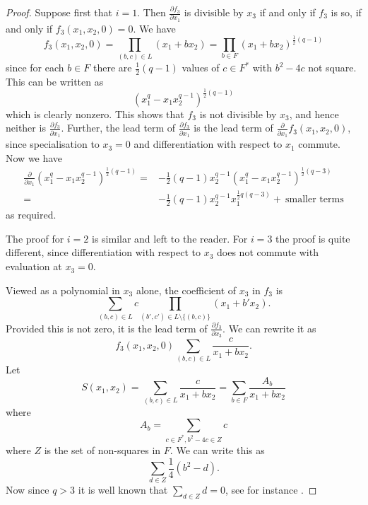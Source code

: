 \documentclass[a4paper]{amsart}
\newtheorem*{Corollary of Conjecture}{Corollary of Conjecture}
\theoremstyle{definition}
\theoremstyle{remark}
\theoremstyle{Acknowledgments}
\begin{document}
\begin{proof}
Suppose first that $i=1$. Then $\frac{\partial f_3}{\partial x_1}$ is divisible by $x_3$ if and only if $f_3$ is so, if and only if $f_3(x_1,x_2,0) = 0$. We have
\[f_3(x_1,x_2,0) = \prod_{(b,c) \in L} (x_1+bx_2) = \prod_{b \in F} (x_1+bx_2)^{\frac12 (q-1)}\]
since for each $b \in F$ there are $\frac12(q-1)$ values of $c \in F^{*}$ with $b^2-4c$ not square. This can be written as
\[(x_1^{q}-x_1x_2^{q-1})^{\frac12(q-1)}\] which is clearly nonzero. This shows that $f_3$ is not divisible by $x_3$, and hence neither is $\frac{\partial f_3}{\partial x_1}$. Further, the lead term of $\frac{\partial f_3}{\partial x_1}$ is the lead term of
$\frac{\partial}{\partial x_1} f_3(x_1,x_2,0)$, since specialisation to $x_3=0$ and differentiation with respect to $x_1$ commute.
Now we have
\begin{align*}  \frac{\partial}{\partial x_1} (x_1^{q}-x_1x_2^{q-1})^{\frac12(q-1)}
=& -\frac12(q-1)x_2^{q-1}(x_1^q-x_1x_2^{q-1})^{\frac12(q-3)}\\
=& -\frac12(q-1) x_2^{q-1}x_1^{\frac12 q(q-3)}+\ \text{smaller terms}
\end{align*}
as required.

 The proof for $i=2$ is similar and left to the reader. For $i=3$ the proof is quite different, since differentiation with respect to $x_3$ does not commute with evaluation at $x_3=0$.

Viewed as a polynomial in $x_3$ alone, the coefficient of $x_3$ in $f_3$ is
\[\sum_{(b,c) \in L} c \prod_{(b',c') \in L \setminus \{(b,c)\} } (x_1+b'x_2).\]
Provided this is not zero, it is the lead term of $\frac{\partial f_3}{\partial x_3}$. We can rewrite it as
\[f_3(x_1,x_2,0) \sum_{(b,c) \in L}\frac{c}{x_1+bx_2}.\]
Let
\[S(x_1,x_2) =  \sum_{(b,c) \in L}\frac{c}{x_1+bx_2} = \sum_{b \in F} \frac{A_b}{x_1+bx_2}\] where 
\[A_b = \sum_{c \in F^*, b^2-4c \in Z} c\] where $Z$ is the set of non-squares in $F$. We can write this as
\[\sum_{d \in Z} \frac14 (b^2-d).\]
Now since $q>3$ it is well known that $\sum_{d \in Z} d = 0$, see for instance \cite[Section~5.1]{LidlNiederreiter}.


\end{proof}
\end{document}
